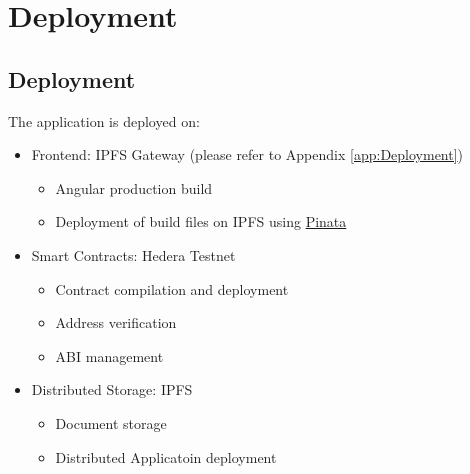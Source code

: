 \documentclass[12pt,a4paper]{article}
\begin{document}
    \section{Deployment}

    \subsection{Deployment}
    The application is deployed on:
    \begin{itemize}
        \item Frontend: IPFS Gateway (please refer to Appendix \ref{app:Deployment})
        \begin{itemize}
            \item Angular production build
            \item Deployment of build files on IPFS using \href{https://app.pinata.cloud/}{Pinata}
        \end{itemize}

        \item Smart Contracts: Hedera Testnet
        \begin{itemize}
            \item Contract compilation and deployment
            \item Address verification
            \item ABI management
        \end{itemize}

        \item Distributed Storage: IPFS
        \begin{itemize}
            \item Document storage
            \item Distributed Applicatoin deployment
        \end{itemize}
    \end{itemize}
\end{document}
